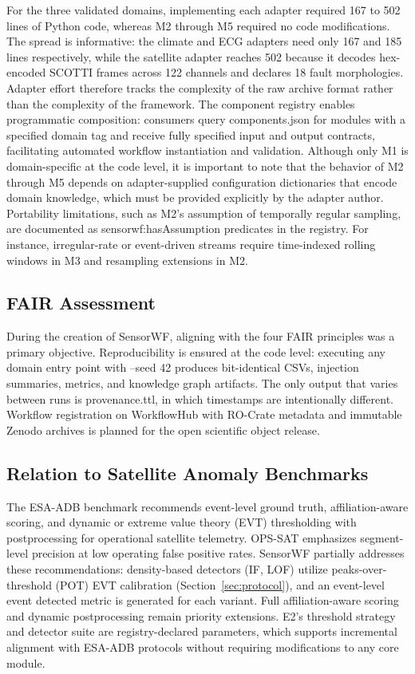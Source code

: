 \documentclass[conference]{IEEEtran}
\begin{document}
For the three validated domains, implementing each adapter required 167 to 502 lines of Python code, whereas M2 through M5 required no code modifications. The spread is informative: the climate and ECG adapters need only 167 and 185 lines respectively, while the satellite adapter reaches 502 because it decodes hex-encoded SCOTTI frames across 122 channels and declares 18 fault morphologies. Adapter effort therefore tracks the complexity of the raw archive format rather than the complexity of the framework. The component registry enables programmatic composition: consumers query components.json for modules with a specified domain tag and receive fully specified input and output contracts, facilitating automated workflow instantiation and validation. Although only M1 is domain-specific at the code level, it is important to note that the behavior of M2 through M5 depends on adapter-supplied configuration dictionaries that encode domain knowledge, which must be provided explicitly by the adapter author. Portability limitations, such as M2's assumption of temporally regular sampling, are documented as sensorwf:hasAssumption predicates in the registry. For instance, irregular-rate or event-driven streams require time-indexed rolling windows in M3 and resampling extensions in M2.

\subsection{FAIR Assessment}

During the creation of SensorWF, aligning with the four FAIR principles was a primary objective. Reproducibility is ensured at the code level: executing any domain entry point with --seed 42 produces bit-identical CSVs, injection summaries, metrics, and knowledge graph artifacts. The only output that varies between runs is provenance.ttl, in which timestamps are intentionally different. Workflow registration on WorkflowHub with RO-Crate metadata and immutable Zenodo archives is planned for the open scientific object release.

\subsection{Relation to Satellite Anomaly Benchmarks}

The ESA-ADB benchmark \cite{esa_adb2024} recommends event-level ground truth, affiliation-aware scoring, and dynamic or extreme value theory (EVT) thresholding with postprocessing for operational satellite telemetry. OPS-SAT \cite{ruszczak2025opssat} emphasizes segment-level precision at low operating false positive rates. SensorWF partially addresses these recommendations: density-based detectors (IF, LOF) utilize peaks-over-threshold (POT) EVT calibration (Section~\ref{sec:protocol}), and an event-level event detected metric is generated for each variant. Full affiliation-aware scoring and dynamic postprocessing remain priority extensions. E2's threshold strategy and detector suite are registry-declared parameters, which supports incremental alignment with ESA-ADB protocols without requiring modifications to any core module.
\end{document}
